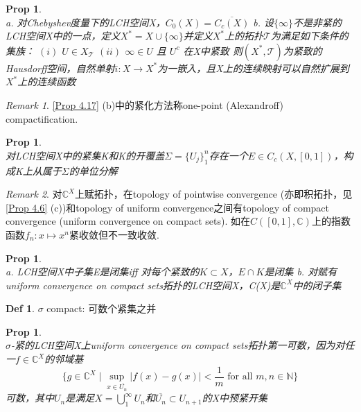 \documentclass[hidelinks]{article}
\theoremstyle{definition}
\newtheorem*{defin}{Def}
\theoremstyle{plain}
\newtheorem{proposition}[theorem]{Prop}
\theoremstyle{remark}
\newtheorem*{remark}{Remark}
\begin{document}
\begin{proposition}\label{Prop 4.17}~\\
a. 对Chebyshev度量下的LCH空间X，$C_0(X)=\overline{C_c(X)}$\newline
b. 设$\{\infty\}$不是非紧的LCH空间X中的一点，定义$X^*=X\cup \{\infty\}$并定义$X^*$上的拓扑$\mathscr{T}$为满足如下条件的集族：\newline
\indent $(i)$ $U\in X_\mathscr{T}$ \newline
\indent $(ii)$ $\infty \in U$ 且 $U^c$ 在X中紧致 \newline
则$(X^*,\mathscr{T})$为紧致的Hausdorff空间，自然单射$i:X\to X^*$为一嵌入，且X上的连续映射可以自然扩展到$X^*$上的连续函数
\end{proposition}

\begin{remark}
\autoref{Prop 4.17} (b)中的紧化方法称one-point (Alexandroff) compactification.
\end{remark}

\begin{proposition}~\\
对LCH空间X中的紧集K和K的开覆盖$\Sigma=\{U_j\}_{1}^{n}$存在一个$E\in C_c(X,[0,1])$，构成K上从属于$\Sigma$的单位分解
\end{proposition}

\begin{remark}
对$\mathbb{C}^X$上赋拓扑，在topology of pointwise convergence (亦即积拓扑，见\autoref{Prop 4.6} (c))和topology of uniform convergence之间有topology of compact convergence (uniform convergence on compact sets). 如在$C([0,1],\mathbb{C})$上的指数函数$f_n:x\mapsto x^n$紧收敛但不一致收敛.
\end{remark}

\begin{proposition}~\\
a. LCH空间X中子集E是闭集iff 对每个紧致的$K\subset X$，$E\cap K$是闭集 \newline
b. 对赋有uniform convergence on compact sets拓扑的LCH空间X，C(X)是$\mathbb{C}^X$中的闭子集
\end{proposition}


\begin{defin}
$\sigma$ compact: 可数个紧集之并
\end{defin}

\begin{proposition}~\\
$\sigma$-紧的LCH空间X上uniform convergence on compact sets拓扑第一可数，因为对任一$f\in \mathbb{C}^X$的邻域基
\[
\bigg\{g\in \mathbb{C}^X\mid \sup_{x\in \overline{U_n}}|f(x)-g(x)|<\frac{1}{m}\textrm{ for all }m,n\in \mathbb{N} \bigg\} 
\]
可数，其中$U_n$是满足$X=\bigcup_{1}^{\infty}U_n$和$\overline{U_n}\subset U_{n+1}$的X中预紧开集
\end{proposition}
\end{document}
